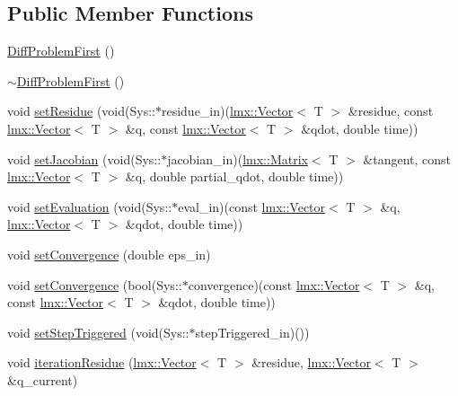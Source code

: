 \subsection*{Public Member Functions}
\begin{DoxyCompactItemize}
\item 
\hyperlink{classlmx_1_1DiffProblemFirst_aaf0fde08317bd8971b7459ef16849608}{Diff\-Problem\-First} ()
\item 
\hyperlink{classlmx_1_1DiffProblemFirst_adaaf9fbfa61386b0cb8b4663d59a8730}{$\sim$\-Diff\-Problem\-First} ()
\item 
void \hyperlink{classlmx_1_1DiffProblemFirst_ae53840b52a86da742f8876c3ce9d84e5}{set\-Residue} (void(Sys\-::$\ast$residue\-\_\-in)(\hyperlink{classlmx_1_1Vector}{lmx\-::\-Vector}$<$ T $>$ \&residue, const \hyperlink{classlmx_1_1Vector}{lmx\-::\-Vector}$<$ T $>$ \&q, const \hyperlink{classlmx_1_1Vector}{lmx\-::\-Vector}$<$ T $>$ \&qdot, double time))
\item 
void \hyperlink{classlmx_1_1DiffProblemFirst_ad92bfc9ce19b1d9dde21174b8293ee87}{set\-Jacobian} (void(Sys\-::$\ast$jacobian\-\_\-in)(\hyperlink{classlmx_1_1Matrix}{lmx\-::\-Matrix}$<$ T $>$ \&tangent, const \hyperlink{classlmx_1_1Vector}{lmx\-::\-Vector}$<$ T $>$ \&q, double partial\-\_\-qdot, double time))
\item 
void \hyperlink{classlmx_1_1DiffProblemFirst_a89d10f2e411120f28b018373dc71cabd}{set\-Evaluation} (void(Sys\-::$\ast$eval\-\_\-in)(const \hyperlink{classlmx_1_1Vector}{lmx\-::\-Vector}$<$ T $>$ \&q, \hyperlink{classlmx_1_1Vector}{lmx\-::\-Vector}$<$ T $>$ \&qdot, double time))
\item 
void \hyperlink{classlmx_1_1DiffProblemFirst_ab27dd5720adba4e053df6466475f26c6}{set\-Convergence} (double eps\-\_\-in)
\item 
void \hyperlink{classlmx_1_1DiffProblemFirst_a385369f5042104f942a424c265cd0e48}{set\-Convergence} (bool(Sys\-::$\ast$convergence)(const \hyperlink{classlmx_1_1Vector}{lmx\-::\-Vector}$<$ T $>$ \&q, const \hyperlink{classlmx_1_1Vector}{lmx\-::\-Vector}$<$ T $>$ \&qdot, double time))
\item 
void \hyperlink{classlmx_1_1DiffProblemFirst_a511df5ff67cf74cf91889c0f0583f611}{set\-Step\-Triggered} (void(Sys\-::$\ast$step\-Triggered\-\_\-in)())
\item 
void \hyperlink{classlmx_1_1DiffProblemFirst_a535b9ed53d511d0cce05279e19505e3f}{iteration\-Residue} (\hyperlink{classlmx_1_1Vector}{lmx\-::\-Vector}$<$ T $>$ \&residue, \hyperlink{classlmx_1_1Vector}{lmx\-::\-Vector}$<$ T $>$ \&q\-\_\-current)

\end{DoxyCompactItemize}
